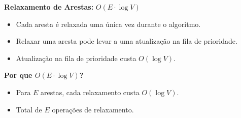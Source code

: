 \documentclass[preview]{standalone}
\begin{document}
\begin{center}
\textbf{Relaxamento de Arestas:} $O(E \cdot \log V)$
            \begin{itemize}
                \item Cada aresta é relaxada uma única vez durante o algoritmo.
                \item Relaxar uma aresta pode levar a uma atualização na fila de prioridade.
                \item Atualização na fila de prioridade custa $O(\log V)$.
            \end{itemize}
            
            \textbf{Por que $O(E \cdot \log V)$?}
            \begin{itemize}
                \item Para $E$ arestas, cada relaxamento custa $O(\log V)$.
                \item Total de $E$ operações de relaxamento.
            \end{itemize}
\end{center}
\end{document}
